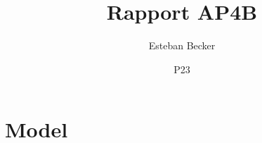 \documentclass[a4paper]{article}
\title{Rapport AP4B}
\author{Esteban Becker}
\date{P23}
\begin{document}
\maketitle

\section{Model}
\end{document}
